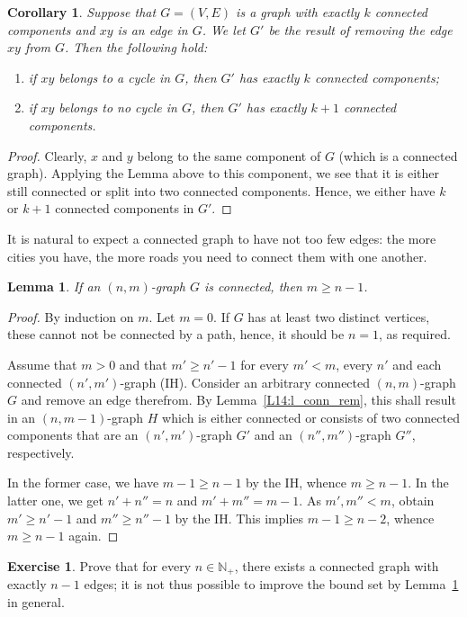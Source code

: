 \documentclass[12pt,notitlepage]{article}
\theoremstyle{plain}
\newtheorem{lemma}[thm]{Lemma}
\newtheorem{corr}[thm]{Corollary}
\theoremstyle{definition}
\newtheorem{exc}[thm]{Exercise}
\theoremstyle{plain}
\newcommand{\N}{\mathbb{N}}
\newcommand{\1}{\mathbf{1}}
\newcommand{\0}{\mathbf{0}}
\begin{document}
\begin{corr}\label{L14:c_conn_rem}
Suppose that $G = (V, E)$ is a graph with exactly $k$ connected components and $xy$ is an edge in $G$. We let $G'$ be the result of removing the edge $xy$ from $G$. Then the following hold:
\begin{enumerate}
\item if $xy$ belongs to a cycle in $G$, then $G'$ has exactly $k$ connected components;
\item if $xy$ belongs to no cycle in $G$, then $G'$ has exactly $k + 1$ connected components.
\end{enumerate}
\end{corr}
\begin{proof}
Clearly, $x$ and $y$ belong to the same component of $G$ (which is a connected graph). Applying the Lemma above to this component, we see that it is either still connected or split into two connected components. Hence, we either have $k$ or $k + 1$ connected components in $G'$.
\end{proof}

It is natural to expect a connected graph to have not too few edges: the more cities you have, the more roads you need to connect them with one another.
\begin{lemma}\label{L14:conn_edge_num}
If an $(n,m)$-graph $G$ is connected, then $m \geq n - 1$.
\end{lemma}
\begin{proof}
By induction on $m$. Let $m = 0$. If $G$ has at least two distinct vertices, these cannot not be connected by a path, hence, it should be $n = 1$, as required.

Assume that $m > 0$ and that $m' \geq n' - 1$ for every $m' < m$, every $n'$ and each connected $(n',m')$-graph (IH). Consider an arbitrary connected $(n, m)$-graph $G$ and remove an edge therefrom. By Lemma~\ref{L14:l_conn_rem}, this shall result in an $(n,m - 1)$-graph $H$ which is either connected or consists of two connected components that are an $(n',m')$-graph $G'$ and an $(n'', m'')$-graph $G''$, respectively.

In the former case, we have $m - 1 \geq n - 1$ by the IH, whence $m \geq n - 1$. In the latter one, we get $n' + n'' = n$ and $m' + m'' = m - 1$. As $m', m'' < m$, obtain $m' \geqslant n' - 1$ and $m'' \geqslant n'' - 1$ by the IH. This implies $m - 1 \geq n - 2$, whence $m \geq n - 1$ again.
\end{proof}

\begin{exc}
Prove that for every $n \in \N_+$, there exists a connected graph with exactly $n - 1$ edges; it is not thus possible to improve the bound set by Lemma~\ref{L14:conn_edge_num} in general.
\end{exc}
\end{document}

